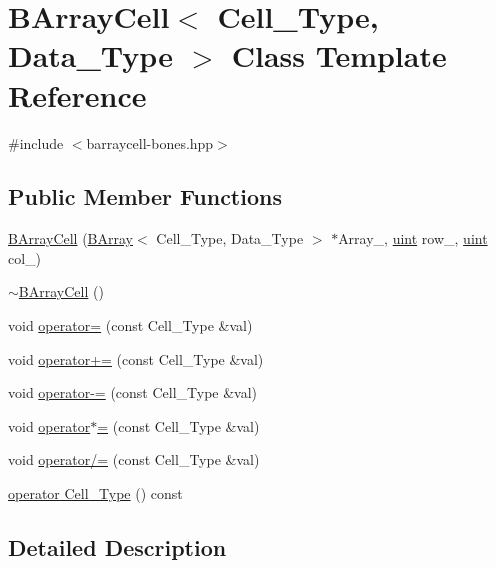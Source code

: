 \hypertarget{class_b_array_cell}{}\section{B\+Array\+Cell$<$ Cell\+\_\+\+Type, Data\+\_\+\+Type $>$ Class Template Reference}
\label{class_b_array_cell}


{\ttfamily \#include $<$barraycell-\/bones.\+hpp$>$}

\subsection*{Public Member Functions}
\begin{DoxyCompactItemize}
\item 
\hyperlink{class_b_array_cell_a0ebc5e7ef22511ee4a04d737b1fe056c}{B\+Array\+Cell} (\hyperlink{class_b_array}{B\+Array}$<$ Cell\+\_\+\+Type, Data\+\_\+\+Type $>$ $\ast$Array\+\_\+, \hyperlink{typedefs_8hpp_a91ad9478d81a7aaf2593e8d9c3d06a14}{uint} row\+\_\+, \hyperlink{typedefs_8hpp_a91ad9478d81a7aaf2593e8d9c3d06a14}{uint} col\+\_\+)
\item 
\hyperlink{class_b_array_cell_a6fbc56424caade490a72685cc35ad0e9}{$\sim$\+B\+Array\+Cell} ()
\item 
void \hyperlink{class_b_array_cell_ad20091ef5961aed4241bd8d0b6d5dd0d}{operator=} (const Cell\+\_\+\+Type \&val)
\item 
void \hyperlink{class_b_array_cell_a2e5c7efcf17bf4acaf17900fb781827b}{operator+=} (const Cell\+\_\+\+Type \&val)
\item 
void \hyperlink{class_b_array_cell_a2f2d39b5e9dfe7d0ef62a42445c85439}{operator-\/=} (const Cell\+\_\+\+Type \&val)
\item 
void \hyperlink{class_b_array_cell_abc193e5d3dd8d04e5d4bb8d808fde35d}{operator$\ast$=} (const Cell\+\_\+\+Type \&val)
\item 
void \hyperlink{class_b_array_cell_aa5debb920d8ffc246e7d463ac8e26152}{operator/=} (const Cell\+\_\+\+Type \&val)
\item 
\hyperlink{class_b_array_cell_a698f664c230f91bf03a97966378e339b}{operator Cell\+\_\+\+Type} () const
\end{DoxyCompactItemize}


\subsection{Detailed Description}
